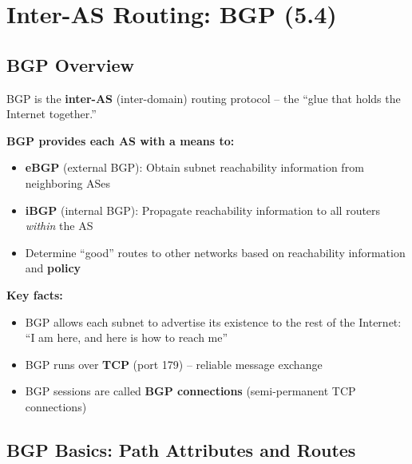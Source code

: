 \begin{imagebox}
\end{imagebox}

\section{Inter-AS Routing: BGP (5.4)}

\subsection{BGP Overview}

\begin{keybox}
BGP is the \textbf{inter-AS} (inter-domain) routing protocol -- the ``glue that holds the Internet together.''

\textbf{BGP provides each AS with a means to:}
\begin{itemize}[noitemsep]
    \item \textbf{eBGP} (external BGP): Obtain subnet reachability information from neighboring ASes
    \item \textbf{iBGP} (internal BGP): Propagate reachability information to all routers \emph{within} the AS
    \item Determine ``good'' routes to other networks based on reachability information and \textbf{policy}
\end{itemize}

\textbf{Key facts:}
\begin{itemize}[noitemsep]
    \item BGP allows each subnet to advertise its existence to the rest of the Internet: ``I am here, and here is how to reach me''
    \item BGP runs over \textbf{TCP} (port 179) -- reliable message exchange
    \item BGP sessions are called \textbf{BGP connections} (semi-permanent TCP connections)
\end{itemize}
\end{keybox}

\subsection{BGP Basics: Path Attributes and Routes}


